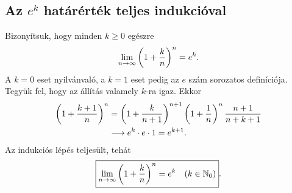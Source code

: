 \documentclass{szb-solution}
\begin{document}
\subsection{Az $e^k$ határérték teljes indukcióval}

Bizonyítsuk, hogy minden $k\geq0$ egészre
$$
  \lim_{n\to\infty}\left(1+\frac{k}{n}\right)^n=e^k
  \text.
$$
A $k=0$ eset nyilvánvaló, a $k=1$ eset pedig az $e$ szám sorozatos
definíciója. Tegyük fel, hogy az állítás valamely $k$-ra igaz. Ekkor
\begin{align*}
  \left(1+\frac{k+1}{n}\right)^n
  &=\left(1+\frac{k}{n+1}\right)^{n+1}
    \left(1+\frac1n\right)^n
    \frac{n+1}{n+k+1}
  \\
  &\longrightarrow e^k\cdot e\cdot1=e^{k+1}
  \text.
\end{align*}
Az indukciós lépés teljesült, tehát
$$
  \boxed{
    \lim_{n\to\infty}\left(1+\frac{k}{n}\right)^n=e^k
    \quad(k\in\mathbb N_0)
  }
  \text.
$$
\end{document}
